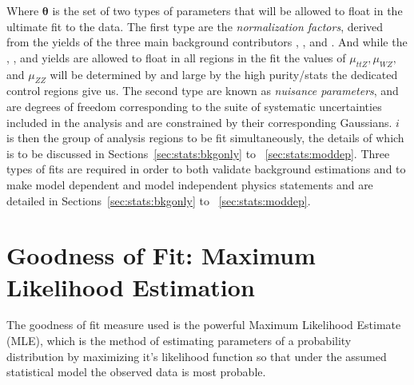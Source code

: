 Where $\boldsymbol\theta$ is the set of two types of parameters that will be allowed to float in the ultimate fit to the data.
The first type are the \emph{normalization factors}, derived from the yields of the three main background contributors \ttZ, \WZ, and \ZZ.
And while the \ttZ, \WZ, and \ZZ yields are allowed to float in all regions in the fit the values of $\mu_{ttZ},\mu_{WZ},$ and $\mu_{ZZ}$ will be determined by and large by the high purity/stats the dedicated control regions give us. 
The second type are known as \emph{nuisance parameters}, and are degrees of freedom corresponding to the suite of systematic uncertainties included in the analysis and are constrained by their corresponding Gaussians.
$i$ is then the group of analysis regions to be fit simultaneously, the details of which is to be discussed in Sections~\ref{sec:stats:bkgonly} to ~\ref{sec:stats:moddep}.
Three types of fits are required in order to both validate background estimations and to make model dependent and model independent physics statements and are detailed in Sections~\ref{sec:stats:bkgonly} to ~\ref{sec:stats:moddep}. 

\section{Goodness of Fit: Maximum Likelihood Estimation}
\label{sec:stats:MLE}
The goodness of fit measure used is the powerful Maximum Likelihood Estimate (MLE), which is the method of estimating parameters of a probability distribution by maximizing it's likelihood function so that under the assumed statistical model the observed data is most probable.

